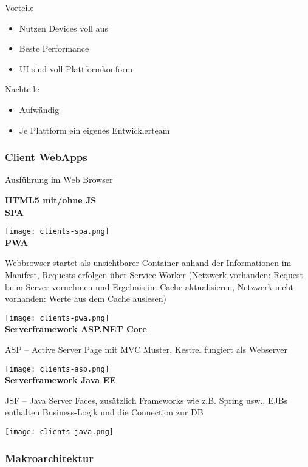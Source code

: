 Vorteile
\begin{itemize}
    \item Nutzen Devices voll aus
    \item Beste Performance
    \item UI sind voll Plattformkonform
\end{itemize}
\vspace{10pt}

Nachteile
\begin{itemize}
    \item Aufwändig
    \item Je Plattform ein eigenes Entwicklerteam
\end{itemize}

\columnbreak
\subsubsection{Client WebApps}

Ausführung im Web Browser

\textbf{HTML5 mit/ohne JS} \\

\textbf{SPA}

\texttt{[image: clients-spa.png]} \\

\textbf{PWA}

Webbrowser startet als unsichtbarer Container anhand der Informationen im Manifest, Requests erfolgen über Service Worker (Netzwerk vorhanden: Request beim Server vornehmen und Ergebnis im Cache aktualisieren, Netzwerk nicht vorhanden: Werte aus dem Cache auslesen)

\texttt{[image: clients-pwa.png]} \\

\columnbreak
\textbf{Serverframework ASP.NET Core}

ASP – Active Server Page mit MVC Muster, Kestrel fungiert als Webserver

\texttt{[image: clients-asp.png]} \\

\textbf{Serverframework Java EE}

JSF – Java Server Faces, zusätzlich Frameworks wie z.B. Spring usw., EJBs enthalten Business-Logik und die Connection zur DB

\texttt{[image: clients-java.png]}

\subsubsection{Makroarchitektur}

